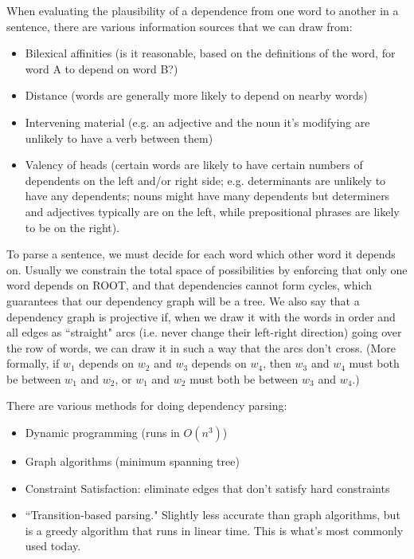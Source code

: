 When evaluating the plausibility of a dependence from one word to another in a sentence, there are various information sources that we can draw from:
\begin{itemize}
\item Bilexical affinities (is it reasonable, based on the definitions of the word, for word A to depend on word B?)
\item Distance (words are generally more likely to depend on nearby words)
\item Intervening material (e.g. an adjective and the noun it's modifying are unlikely to have a verb between them)
\item Valency of heads (certain words are likely to have certain numbers of dependents on the left and/or right side; e.g. determinants are unlikely to have any dependents; nouns might have many dependents but determiners and adjectives typically are on the left, while prepositional phrases are likely to be on the right).
\end{itemize}

To parse a sentence, we must decide for each word which other word it depends on. Usually we constrain the total space of possibilities by enforcing that only one word depends on ROOT, and that dependencies cannot form cycles, which guarantees that our dependency graph will be a tree. We also say that a dependency graph is projective if, when we draw it with the words in order and all edges as ``straight" arcs (i.e. never change their left-right direction) going over the row of words, we can draw it in such a way that the arcs don't cross. (More formally, if $w_1$ depends on $w_2$ and $w_3$ depends on $w_4$, then $w_3$ and $w_4$ must both be between $w_1$ and $w_2$, or $w_1$ and $w_2$ must both be between $w_3$ and $w_4$.)

There are various methods for doing dependency parsing:
\begin{itemize}
\item Dynamic programming (runs in $O(n^3)$)
\item Graph algorithms (minimum spanning tree)
\item Constraint Satisfaction: eliminate edges that don't satisfy hard constraints
\item ``Transition-based parsing." Slightly less accurate than graph algorithms, but is a greedy algorithm that runs in linear time. This is what's most commonly used today.
\end{itemize}
